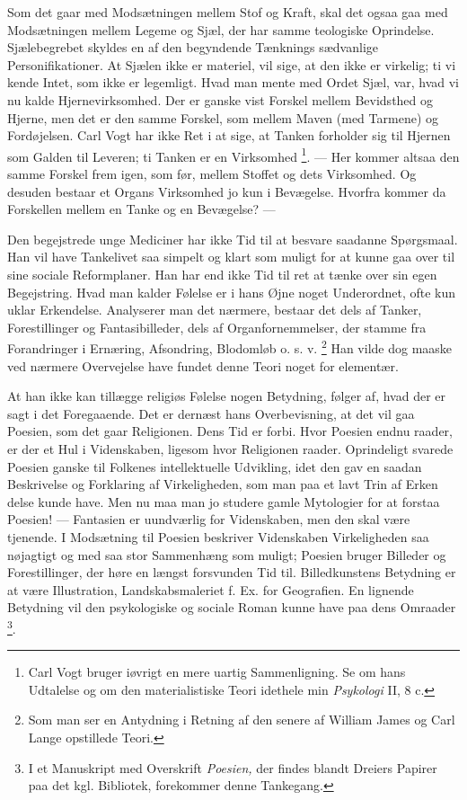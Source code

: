\documentclass[12pt,a4paper,openany]{book}
\newcommand{\opage}[1]{\marginnote{\footnotesize\textit{[#1]}}}
\begin{document}
Som det gaar med Modsætningen mellem Stof og Kraft, skal det ogsaa gaa med
Modsætningen mellem Legeme og Sjæl, der har samme teologiske Oprindelse.
Sjælebegrebet
\setcounter{footnote}{0}%
\opage{180}skyldes en af den begyndende Tænknings sædvanlige Personifikationer.
At Sjælen ikke er materiel, vil sige, at den ikke er virkelig; ti vi kende
Intet, som ikke er legemligt. Hvad man mente med Ordet Sjæl, var, hvad vi nu
kalde Hjernevirksomhed. Der er ganske vist Forskel mellem Bevidsthed og Hjerne,
men det er den samme Forskel, som mellem Maven (med Tarmene) og Fordøjelsen.
Carl Vogt har ikke Ret i at sige, at Tanken forholder sig til Hjernen som
Galden til Leveren; ti Tanken er en Virksomhed%
\footnote[1]{Carl Vogt bruger iøvrigt en mere uartig Sammenligning. Se om hans
Udtalelse og om den materialistiske Teori idethele min \textit{Psykologi} II, 8
c.}. --- Her kommer altsaa den samme Forskel frem igen, som før, mellem Stoffet
og dets Virksomhed. Og desuden bestaar et Organs Virksomhed jo kun i Bevægelse.
Hvorfra kommer da Forskellen mellem en Tanke og en Bevægelse? ---

Den begejstrede unge Mediciner har ikke Tid til at besvare saadanne Spørgsmaal.
Han vil have Tankelivet saa simpelt og klart som muligt for at kunne gaa over
til sine sociale Reformplaner. Han har end ikke Tid til ret at tænke over sin
egen Begejstring. Hvad man kalder Følelse er i hans Øjne noget Underordnet,
ofte kun uklar Erkendelse. Analyserer man det nærmere, bestaar det dels af
Tanker, Forestillinger og Fantasibilleder, dels af Organfornemmelser, der
stamme fra Forandringer i Ernæring, Afsondring, Blodomløb o. s. v.%
\footnote[2]{Som man ser en Antydning i Retning af den senere af William James
og Carl Lange opstillede Teori.} Han vilde dog maaske ved nærmere Overvejelse
have fundet denne Teori noget for elementær.

At han ikke kan tillægge religiøs Følelse nogen Betydning, følger af, hvad der
er sagt i det Foregaaende. Det er dernæst hans Overbevisning, at det vil gaa
Poesien, som det gaar Religionen. Dens Tid er forbi. Hvor Poesien endnu raader,
er der et Hul i Videnskaben, ligesom hvor Religionen raader. Oprindeligt
svarede Poesien ganske til Folkenes intellektuelle Udvikling, idet den gav en
saadan Beskrivelse og Forklaring af Virkeligheden, som man paa et lavt Trin af Erken%
\setcounter{footnote}{0}%
\opage{181}delse kunde have. Men nu maa man jo studere gamle Mytologier for at
forstaa Poesien! --- Fantasien er uundværlig for Videnskaben, men den skal være
tjenende. I Modsætning til Poesien beskriver Videnskaben Virkeligheden saa
nøjagtigt og med saa stor Sammenhæng som muligt; Poesien bruger Billeder og
Forestillinger, der høre en længst forsvunden Tid til. Billedkunstens Betydning
er at være Illustration, Landskabsmaleriet f. Ex. for Geografien. En lignende
Betydning vil den psykologiske og sociale Roman kunne have paa dens Omraader%
\footnote[1]{I et Manuskript med Overskrift \textit{Poesien,} der findes blandt
Dreiers Papirer paa det kgl. Bibliotek, forekommer denne Tankegang.}.
\end{document}
